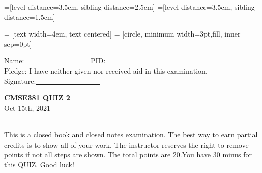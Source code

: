 \documentclass[11pt,answers,addpoints]{exam}
\begin{document}
=[level distance=3.5cm, sibling distance=2.5cm]
=[level distance=3.5cm, sibling distance=1.5cm]

 = [text width=4em, text centered]  =
[circle, minimum width=3pt,fill, inner sep=0pt]

\CorrectChoiceEmphasis{\color{red}\bfseries}
\bracketedpoints
{}
\setlength\answerskip{0.05ex}


\begin{flushleft}
Name:\underline{~~~~~~~~~~~~~~~~~~} \hfill PID:\underline{~~~~~~~~~~~~~~~~}\\ \vskip 1cm
Pledge: I have neither given nor received aid in this examination.\\ \vskip 1cm
Signature:\underline{~~~~~~~~~~~~~~~~~~}
\end{flushleft}

\begin{center}
{\Large {\bf CMSE381  QUIZ 2} }\\
\vspace{2ex} Oct 15th, 2021
\end{center}

\\
This is a closed book and closed notes examination. The best way to earn partial credits is to show all of your work. The instructor reserves
the right to remove points if not all steps are shown. The total points are 20.You have 30 minus for this QUIZ. Good luck!

\mbox{}

\makebox[5.5in]{\hrulefill}\\
\end{document}
